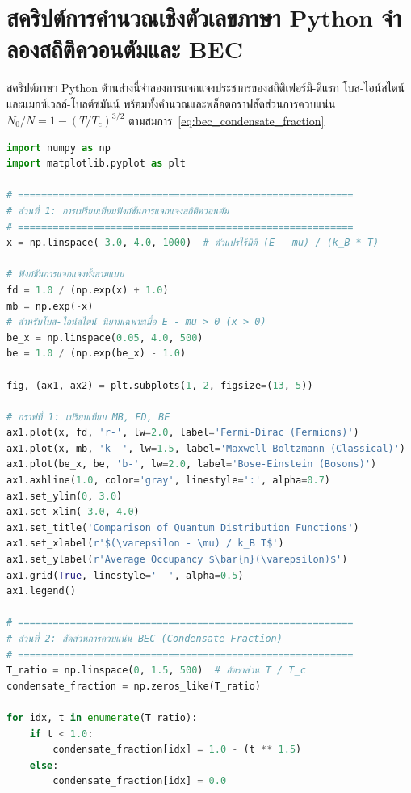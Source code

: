 \section{สคริปต์การคำนวณเชิงตัวเลขภาษา Python จำลองสถิติควอนตัมและ BEC}

สคริปต์ภาษา Python ด้านล่างนี้จำลองการแจกแจงประชากรของสถิติเฟอร์มิ-ดิแรก โบส-ไอน์สไตน์ และแมกซ์เวลล์-โบลต์ซมันน์ พร้อมทั้งคำนวณและพล็อตกราฟสัดส่วนการควบแน่น $N_0/N = 1 - (T/T_c)^{3/2}$ ตามสมการ~\eqref{eq:bec_condensate_fraction}

\begin{tcolorbox}[colback=slateGrey!5, colframe=darkNavy, title={\textbf{Python 3 Script ---- Quantum Statistics \& BEC Phase Transition Simulator}}]
\begin{lstlisting}[language=Python]
import numpy as np
import matplotlib.pyplot as plt

# ==========================================================
# ส่วนที่ 1: การเปรียบเทียบฟังก์ชันการแจกแจงสถิติควอนตัม
# ==========================================================
x = np.linspace(-3.0, 4.0, 1000)  # ตัวแปรไร้มิติ (E - mu) / (k_B * T)

# ฟังก์ชันการแจกแจงทั้งสามแบบ
fd = 1.0 / (np.exp(x) + 1.0)
mb = np.exp(-x)
# สำหรับโบส-ไอน์สไตน์ นิยามเฉพาะเมื่อ E - mu > 0 (x > 0)
be_x = np.linspace(0.05, 4.0, 500)
be = 1.0 / (np.exp(be_x) - 1.0)

fig, (ax1, ax2) = plt.subplots(1, 2, figsize=(13, 5))

# กราฟที่ 1: เปรียบเทียบ MB, FD, BE
ax1.plot(x, fd, 'r-', lw=2.0, label='Fermi-Dirac (Fermions)')
ax1.plot(x, mb, 'k--', lw=1.5, label='Maxwell-Boltzmann (Classical)')
ax1.plot(be_x, be, 'b-', lw=2.0, label='Bose-Einstein (Bosons)')
ax1.axhline(1.0, color='gray', linestyle=':', alpha=0.7)
ax1.set_ylim(0, 3.0)
ax1.set_xlim(-3.0, 4.0)
ax1.set_title('Comparison of Quantum Distribution Functions')
ax1.set_xlabel(r'$(\varepsilon - \mu) / k_B T$')
ax1.set_ylabel(r'Average Occupancy $\bar{n}(\varepsilon)$')
ax1.grid(True, linestyle='--', alpha=0.5)
ax1.legend()

# ==========================================================
# ส่วนที่ 2: สัดส่วนการควบแน่น BEC (Condensate Fraction)
# ==========================================================
T_ratio = np.linspace(0, 1.5, 500)  # อัตราส่วน T / T_c
condensate_fraction = np.zeros_like(T_ratio)

for idx, t in enumerate(T_ratio):
    if t < 1.0:
        condensate_fraction[idx] = 1.0 - (t ** 1.5)
    else:
        condensate_fraction[idx] = 0.0


\end{lstlisting}
\end{tcolorbox}
